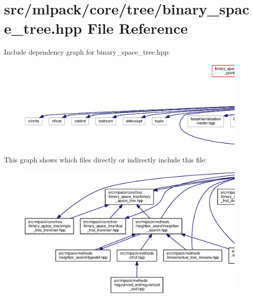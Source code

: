 \section{src/mlpack/core/tree/binary\+\_\+space\+\_\+tree.hpp File Reference}
\label{binary__space__tree_8hpp}
Include dependency graph for binary\+\_\+space\+\_\+tree.\+hpp\+:
\nopagebreak
\begin{figure}[H]
\begin{center}
\leavevmode
\includegraphics[width=350pt]{binary__space__tree_8hpp__incl}
\end{center}
\end{figure}
This graph shows which files directly or indirectly include this file\+:
\nopagebreak
\begin{figure}[H]
\begin{center}
\leavevmode
\includegraphics[width=350pt]{binary__space__tree_8hpp__dep__incl}
\end{center}
\end{figure}
